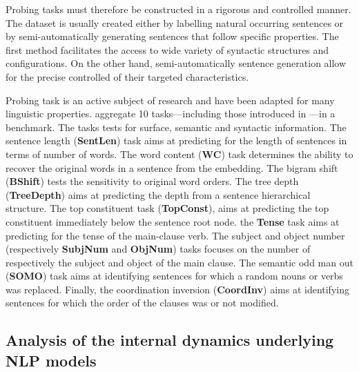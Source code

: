 Probing tasks must therefore be constructed in a rigorous and controlled manner. The dataset is usually created either by labelling natural occurring sentences or by semi-automatically generating sentences that follow specific properties. The first method facilitates the access to wide variety of syntactic structures and configurations. On the other hand, semi-automatically sentence generation allow for the precise controlled of their targeted characteristics.


Probing task is an active subject of research and have been adapted for many linguistic properties.\textcite{baroni_18} aggregate 10 tasks—including those introduced in \textcite{adi_17}—in a benchmark. The tasks tests for surface, semantic and syntactic information. The sentence length (\textbf{SentLen}) task aims at predicting for the length of sentences in terms of number of words. The word content (\textbf{WC}) task determines the ability to recover the original words in a sentence from the embedding. The bigram shift (\textbf{BShift}) tests the sensitivity to original word orders. The tree depth (\textbf{TreeDepth}) aims at predicting the depth from a sentence hierarchical structure. The top constituent task (\textbf{TopConst}), aims at predicting the top constituent immediately below the sentence root node. the \textbf{Tense} task aims at predicting for the tense of the main-clause verb. The subject and object number (respectively \textbf{SubjNum} and \textbf{ObjNum}) tasks focuses on the number of respectively the subject and object of the main clause. The semantic odd man out (\textbf{SOMO}) task aims at identifying sentences for which a random nouns or verbs was replaced. Finally, the coordination inversion (\textbf{CoordInv}) aims at identifying sentences for which the order of the clauses was or not modified.






\subsection{Analysis of the internal dynamics underlying NLP models}

